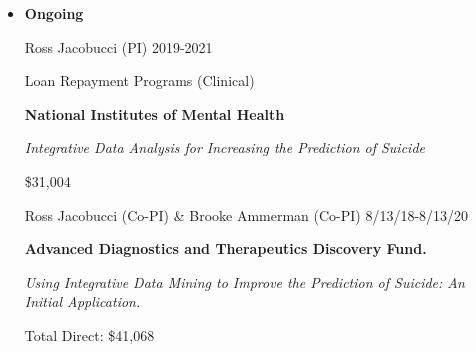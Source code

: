 \documentclass[letterpaper,10pt]{article}
\begin{document}
\begin{itemize} 
	\setlength{\topsep}{0pt}%
	\setlength{\leftmargin}{0.1in}%
	\setlength{\listparindent}{-0.1in}%
	\setlength{\itemindent}{-0.2in}%
	\setlength{\parsep}{\parskip}%
\begin{comment}		
	\item {\textbf{\large{Pending}}}


\begin{center}
	\parbox{6.5in}{{Ross Jacobucci (PI) }   \hspace{9cm} Under Review}
	\parbox{6.5in}{\textbf{IES Statistical and Research Methodology in Education: Early Career Grant} }
	\parbox{6.5in}{\textit{Extending Regularized Structural Equation Modeling for Big Data in Education Research}}
	\parbox{6.5in}{Total Direct: \$139,759}
\end{center}

\begin{center}
	\parbox{6.5in}{{Ross Jacobucci (Co-PI) \& Brooke Ammerman (Co-PI)}   \hspace{3.8cm} Under Review}
	\parbox{6.5in}{\textbf{NIH 1R03MH120488-01} }
	\parbox{6.5in}{\textit{The Implementation and Validation of Integrative Machine Learning for Predicting Suicide Outcomes}}
	\parbox{6.5in}{Total Direct: \$99,188}
\end{center}
\end{comment}	

	
	\item{\textbf{\large{Ongoing}}}
	
	\begin{center}
		\parbox{6.5in}{{Ross Jacobucci (PI) }   \hspace{9cm} 2019-2021}
		\parbox{6.5in}{Loan Repayment Programs (Clinical)}
		\parbox{6.5in}{\textbf{National Institutes of Mental Health} }
		\parbox{6.5in}{\textit{Integrative Data Analysis for Increasing the Prediction of Suicide}}
		\parbox{6.5in}{\$31,004}
	\end{center}
	
	
	
	\begin{center}
		\parbox{6.5in}{{Ross Jacobucci (Co-PI) \& Brooke Ammerman (Co-PI)}   \hspace{3.8cm} 8/13/18-8/13/20}
		\parbox{6.5in}{\textbf{Advanced Diagnostics and Therapeutics Discovery Fund.} }
		\parbox{6.5in}{\textit{Using Integrative Data Mining to Improve the Prediction of Suicide: An Initial Application.}}
		\parbox{6.5in}{Total Direct: \$41,068}
	\end{center}


\end{itemize}
\end{document}

